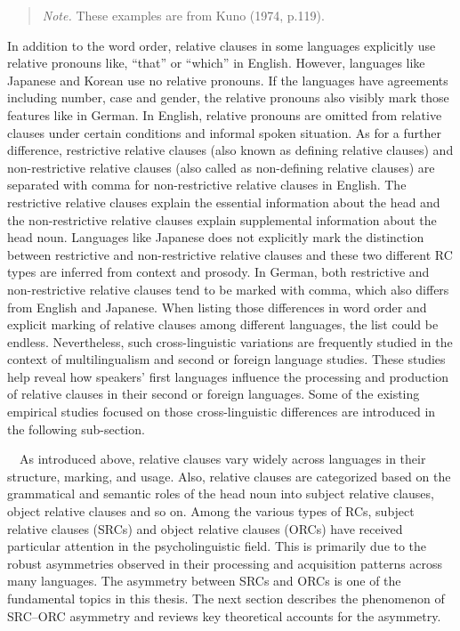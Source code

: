 \documentclass[
]{article}
\begin{document}
\noindent
\begin{quote}
\small
\textit{Note.} These examples are from Kuno (1974, p.119).
\end{quote}

\vspace{1em}

\setlength{\parindent}{1.27cm}

In addition to the word order, relative clauses in some languages
explicitly use relative pronouns like, ``that'' or ``which'' in English.
However, languages like Japanese and Korean use no relative pronouns. If
the languages have agreements including number, case and gender, the
relative pronouns also visibly mark those features like in German. In
English, relative pronouns are omitted from relative clauses under
certain conditions and informal spoken situation. As for a further
difference, restrictive relative clauses (also known as defining
relative clauses) and non-restrictive relative clauses (also called as
non-defining relative clauses) are separated with comma for
non-restrictive relative clauses in English. The restrictive relative
clauses explain the essential information about the head and the
non-restrictive relative clauses explain supplemental information about
the head noun. Languages like Japanese does not explicitly mark the
distinction between restrictive and non-restrictive relative clauses and
these two different RC types are inferred from context and prosody. In
German, both restrictive and non-restrictive relative clauses tend to be
marked with comma, which also differs from English and Japanese. When
listing those differences in word order and explicit marking of relative
clauses among different languages, the list could be endless.
Nevertheless, such cross-linguistic variations are frequently studied in
the context of multilingualism and second or foreign language studies.
These studies help reveal how speakers' first languages influence the
processing and production of relative clauses in their second or foreign
languages. Some of the existing empirical studies focused on those
cross-linguistic differences are introduced in the following
sub-section.

\indent　As introduced above, relative clauses vary widely across
languages in their structure, marking, and usage. Also, relative clauses
are categorized based on the grammatical and semantic roles of the head
noun into subject relative clauses, object relative clauses and so on.
Among the various types of RCs, subject relative clauses (SRCs) and
object relative clauses (ORCs) have received particular attention in the
psycholinguistic field. This is primarily due to the robust asymmetries
observed in their processing and acquisition patterns across many
languages. The asymmetry between SRCs and ORCs is one of the fundamental
topics in this thesis. The next section describes the phenomenon of
SRC--ORC asymmetry and reviews key theoretical accounts for the
asymmetry.
\end{document}
